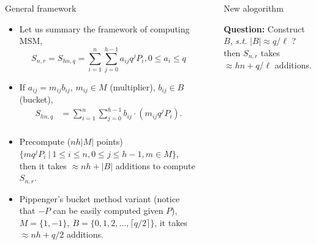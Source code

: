 \documentclass[final]{beamer}
\newlength{\sepwid}
\newlength{\onecolwid}
\begin{document}
\begin{frame}[t]
\begin{columns}[t]
\begin{column}{\onecolwid}
\begin{block}{General framework}
\small
	\begin{itemize}	
		\item Let us summary the framework of computing MSM,
		$$ S_{n,r} = S_{hn,q}=\sum_{i=1}^{n}\sum_{j=0}^{h-1} a_{ij}q^j P_i, 0\le a_i\le q $$
		
		\item If $a_{ij} = m_{ij}b_{ij}$, $m_{ij}\in M$ (multiplier), $b_{ij}\in B$ (bucket),
			\begin{equation*}
			\begin{aligned}
			S_{hn,q}&= \sum_{i=1}^{n}\sum_{j=0}^{h-1}b_{ij}\cdot (m_{ij}q^jP_i).\\
			\end{aligned} 
			\end{equation*}
		\item Precompute ($nh|M|$ points) \\
		$\{mq^jP_i\ |\ 1\le i\le n,0\le j\le h-1,m\in M\}$,\\
		then it takes $\approx nh +|B|$ additions to compute $S_{n,r}$.
		
		\item Pippenger's bucket method variant (notice that $-P$ can be easily computed given $P$),\\
		$M =\{1,-1\},\ B =\{0,1,2,...,\lceil q/2\rceil\}$, it takes $\approx nh + q/2$ additions.
	\end{itemize}

\end{block}
\end{column} 


\begin{column}{\sepwid}\end{column} %

\begin{column}{\onecolwid} 

\begin{block}{New alogorithm}
\small
	\begin{center}	
		\textbf{Question:} Construct $B$, \textit{s.t.} $|B|\approx q/\ell$ ?\\ then $S_{n,r}$ takes $\approx hn + q/\ell$ additions.
	\end{center}


\end{block}
\end{column}
\end{columns}
\end{frame}
\end{document}
